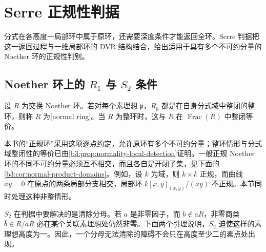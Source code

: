 
\section{Serre 正规性判据}
\label{b3:sec:2002}

分式在各高度一局部环中属于原环，还需要深度条件才能返回全环。Serre 判据把这一返回过程与一维局部环的 DVR 结构结合，给出适用于具有多个不可约分量的 Noether 环的正规性判别。


%
%

\subsection{Noether 环上的 \texorpdfstring{\(R_1\)}{R1} 与 \texorpdfstring{\(S_2\)}{S2} 条件}
\label{b3:subsec:2002:01}

\begin{definition}\label{b3:def:normal-noether-ring}
	设 \(R\) 为交换 Noether 环。若对每个素理想 \(\mathfrak p\)，\(R_{\mathfrak p}\) 都是在自身分式域中整闭的整环，则称 \(R\) 为[normal ring]。当 \(R\) 为整环时，这与 \(R\) 在 \(\operatorname{Frac}(R)\) 中整闭等价。
\end{definition}

本书的“正规环”采用这项逐点约定，允许原环有多个不可约分量；整环情形与分式域整闭性的等价已由\cref{b3:prop:normality-local-detection}证明。一般正规 Noether 环的不同不可约分量必须互不相交，而且各自是开闭子集，见下面的\cref{b3:cor:normal-product-domains}。例如，设 \(k\) 为域，则 \(k\times k\) 正规，而曲线 \(xy=0\) 在原点的两条局部分支相交，局部环 \(k[x,y]_{(x,y)}/(xy)\) 不正规。本节同时处理这种非整情形。

\ProseParagraphBreak
\(S_2\) 在判据中要解决的是清除分母。若 \(a\) 是非零因子，而 \(b\notin aR\)，非零商类 \(\bar b\in R/aR\) 必在某个关联素理想处仍然非零。下面两个引理说明，\(S_2\) 迫使这样的素理想高度为一。因此，一个分母无法清除的障碍不会只在高度至少二的素点处出现。

